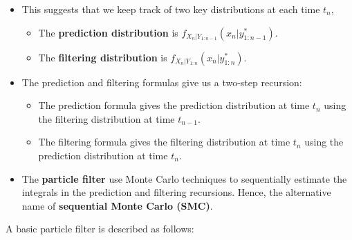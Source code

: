 \documentclass[
  letterpaper,
  DIV=11,
  numbers=noendperiod]{scrartcl}
\providecommand{\tightlist}{%
  \setlength{\itemsep}{0pt}\setlength{\parskip}{0pt}}\usepackage{longtable,booktabs,array}
\begin{document}
\begin{itemize}
\item
  This suggests that we keep track of two key distributions at each time
  \(t_n\),

  \begin{itemize}
  \tightlist
  \item
    The \textbf{prediction distribution} is
    \(f_{X_n | Y_{1:n-1}}(x_n| y^*_{1:n-1})\).
  \item
    The \textbf{filtering distribution} is
    \(f_{X_{n} | Y_{1:n}}(x_n| y^*_{1:n})\).
  \end{itemize}
\item
  The prediction and filtering formulas give us a two-step recursion:

  \begin{itemize}
  \tightlist
  \item
    The prediction formula gives the prediction distribution at time
    \(t_n\) using the filtering distribution at time \(t_{n-1}\).
  \item
    The filtering formula gives the filtering distribution at time
    \(t_n\) using the prediction distribution at time \(t_n\).
  \end{itemize}
\item
  The \textbf{particle filter} use Monte Carlo techniques to
  sequentially estimate the integrals in the prediction and filtering
  recursions. Hence, the alternative name of \textbf{sequential Monte
  Carlo (SMC)}.
\end{itemize}

\framebreak

A basic particle filter is described as follows:
\end{document}
